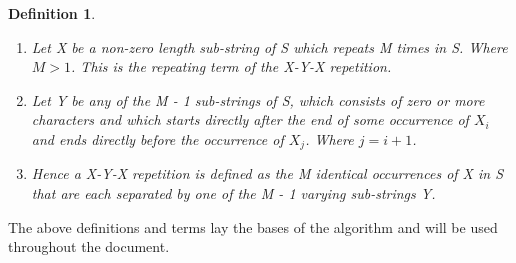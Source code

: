 \documentclass[12pt]{article}
\newtheorem{defn}{Definition}[section]
\begin{document}
\begin{flushleft}
\begin{defn}
\begin{enumerate}
			\item Let X be a non-zero length sub-string of S which repeats M times in S. Where $ M > 1 $. This is the repeating term of the X-Y-X repetition.		
			\item  Let Y be any of the M - 1 sub-strings of S, which consists of zero or more characters and which starts directly after the end of some occurrence of $X_{i}$ and ends directly before the occurrence of $X_{j}$. Where $j = i + 1$.
			\item Hence a X-Y-X repetition is defined as the M identical occurrences of X in S that are each separated by one of the M - 1 varying sub-strings Y.	
		\end{enumerate}
	\end{defn}
	
	The above definitions and terms lay the bases of the algorithm and will be used throughout the document.
\end{flushleft}
\newpage
\end{document}
